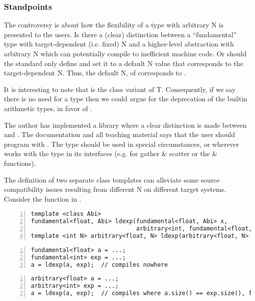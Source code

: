 \subsubsection{Standpoints}
The controversy is about how the flexibility of a type with arbitrary \code N is presented to the users.
Is there a (clear) distinction between a “fundamental” type with target-dependent (i.e. fixed) \code N and a higher-level abstraction with arbitrary \code N which can potentially compile to inefficient machine code.
Or should the \CC{} standard only define  and set it to a default \code N value that corresponds to the target-dependent \code N.
Thus, the default \code N, of  corresponds to .

It is interesting to note that  is the class variant of \type T.
Consequently, if we say there is no need for a  type then we could argue for the deprecation of the builtin arithmetic types, in favor of . 

The author has implemented a library where a clear distinction is made between  and .
The documentation and all teaching material says that the user should program with .
The  type should be used in special circumstances, or wherever  works with the  type in its interfaces (e.g. for gather \& scatter or the  \&  functions).

The definition of two separate class templates can alleviate some source compatibility issues resulting from different \code N on different target systems.
Consider the  function in .
\begin{lstlisting}[style=Vc,numbers=left,float,label=lst:ldexp,caption={
  Declaration of \code{ldexp} for \type{fundamental} and \type{arbitrary} (only single-precision \float).
}]
template <class Abi>
fundamental<float, Abi> ldexp(fundamental<float, Abi> x,
                              arbitrary<int, fundamental<float, Abi>::size()> exp);
template <int N> arbitrary<float, N> ldexp(arbitrary<float, N> x, arbitrary<int, N> exp);
\end{lstlisting}
\begin{lstlisting}[style=Vc,numbers=left,float,label=lst:fundamental-ldexp,caption={
  Calls to \code{ldexp} compile or fail to compile independent of the target.
}]
fundamental<float> a = ...;
fundamental<int> exp = ...;
a = ldexp(a, exp);  // compiles nowhere
\end{lstlisting}
\begin{lstlisting}[style=Vc,numbers=left,float,label=lst:arbitrary-ldexp,caption={
  Calls to \code{ldexp} compile or fail to compile depending on the target.
}]
arbitrary<float> a = ...;
arbitrary<int> exp = ...;
a = ldexp(a, exp);  // compiles where a.size() == exp.size(), fails otherwise
\end{lstlisting}


